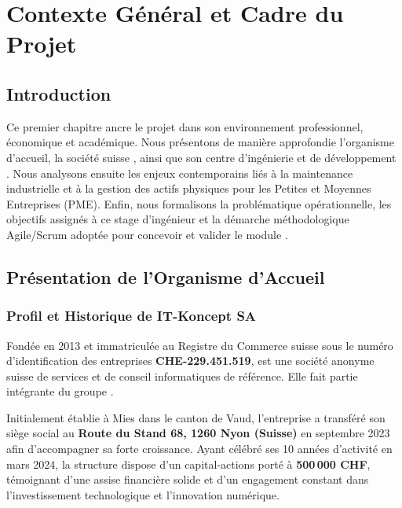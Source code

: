 \chapter{Contexte Général et Cadre du Projet}
\label{chap:context}

\section{Introduction}
Ce premier chapitre ancre le projet dans son environnement professionnel, économique et académique. Nous présentons de manière approfondie l'organisme d'accueil, la société suisse \textbf{\companyName}, ainsi que son centre d'ingénierie et de développement \textbf{\companySubsidiary}. Nous analysons ensuite les enjeux contemporains liés à la maintenance industrielle et à la gestion des actifs physiques pour les Petites et Moyennes Entreprises (PME). Enfin, nous formalisons la problématique opérationnelle, les objectifs assignés à ce stage d'ingénieur et la démarche méthodologique Agile/Scrum adoptée pour concevoir et valider le module \textbf{\odooModule}.

\section{Présentation de l'Organisme d'Accueil}

\subsection{Profil et Historique de IT-Koncept SA}
Fondée en 2013 et immatriculée au Registre du Commerce suisse sous le numéro d'identification des entreprises \textbf{CHE-229.451.519}, \textbf{\companyName} est une société anonyme suisse de services et de conseil informatiques de référence. Elle fait partie intégrante du groupe \textbf{\companyGroup}.

Initialement établie à Mies dans le canton de Vaud, l'entreprise a transféré son siège social au \textbf{Route du Stand 68, 1260 Nyon (Suisse)} en septembre 2023 afin d'accompagner sa forte croissance. Ayant célébré ses 10 années d'activité en mars 2024, la structure dispose d'un capital-actions porté à \textbf{500\,000 CHF}, témoignant d'une assise financière solide et d'un engagement constant dans l'investissement technologique et l'innovation numérique.


